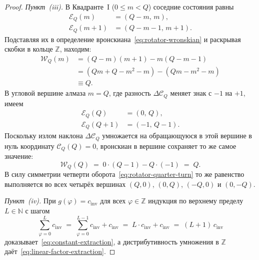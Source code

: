 \documentclass[11pt,a4paper]{article}
\theoremstyle{plain}
\theoremstyle{definition}
\begin{document}
\begin{proof}
\emph{Пункт~(iii).} В Квадранте~I ($0 \le m < Q$) соседние состояния равны
\begin{align*}
  \mathcal{E}_Q(m) &= (Q - m,\, m), \\
  \mathcal{E}_Q(m + 1) &= (Q - m - 1,\, m + 1).
\end{align*}
Подставляя их в определение вронскиана~\eqref{eq:rotator-wronskian} и раскрывая скобки в кольце $\mathbb{Z}$, находим:
\begin{align*}
  \mathcal{W}_Q(m) &= (Q - m)(m + 1) - m(Q - m - 1) \\
  &= (Qm + Q - m^2 - m) - (Qm - m^2 - m) \\
  &\equiv Q.
\end{align*}
В угловой вершине алмаза $m = Q$, где разность $\Delta\mathcal{C}_Q$ меняет знак с $-1$ на $+1$, имеем
\begin{align*}
  \mathcal{E}_Q(Q) &= (0,\, Q), \\
  \mathcal{E}_Q(Q + 1) &= (-1,\, Q - 1).
\end{align*}
Поскольку излом наклона $\Delta\mathcal{C}_Q$ умножается на обращающуюся в этой вершине в нуль координату $\mathcal{C}_Q(Q) = 0$, вронскиан в вершине сохраняет то же самое значение:
\begin{equation*}
  \mathcal{W}_Q(Q) \;=\; 0\cdot(Q - 1) - Q\cdot(-1) \;=\; Q.
\end{equation*}
В силу симметрии четверти оборота~\eqref{eq:rotator-quarter-turn} то же равенство выполняется во всех четырёх вершинах $(Q,0)$, $(0,Q)$, $(-Q,0)$ и $(0,-Q)$.

\emph{Пункт~(iv).} При $g(\varphi) = c_{\mathrm{inv}}$ для всех $\varphi \in \mathbb{Z}$ индукция по верхнему пределу $L \in \mathbb{N}$ с шагом
\begin{equation*}
  \sum_{\varphi=0}^{L} c_{\mathrm{inv}} \;=\; \sum_{\varphi=0}^{L-1} c_{\mathrm{inv}} + c_{\mathrm{inv}} \;=\; L\cdot c_{\mathrm{inv}} + c_{\mathrm{inv}} \;=\; (L + 1)\,c_{\mathrm{inv}}
\end{equation*}
доказывает~\eqref{eq:constant-extraction}, а дистрибутивность умножения в $\mathbb{Z}$ даёт~\eqref{eq:linear-factor-extraction}.
\end{proof}
\end{document}

